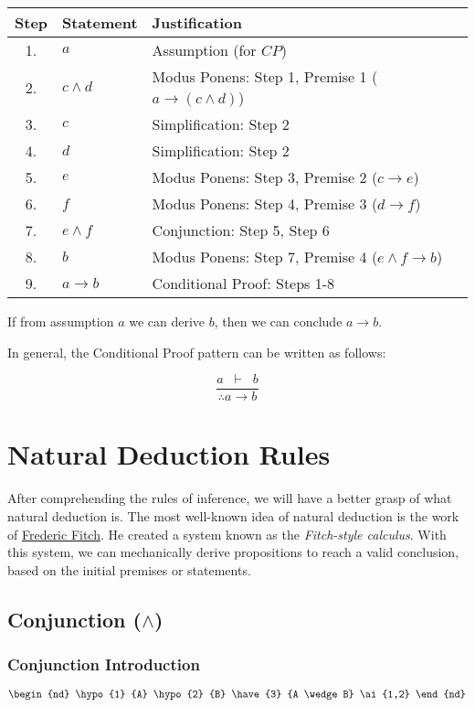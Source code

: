 \documentclass[12pt,a4paper,openany]{article}
\begin{document}
\begin{center}
\begin{tabular}{|c|l|l|}
\hline
\textbf{Step} & \textbf{Statement} & \textbf{Justification} \\
\hline
1. & \(a\) & Assumption (for \(CP\)) \\
2. & \(c \land d\) & Modus Ponens: Step 1, Premise 1 (\(a \to (c \land d)\)) \\
3. & \(c\) & Simplification: Step 2 \\
4. & \(d\) & Simplification: Step 2 \\
5. & \(e\) & Modus Ponens: Step 3, Premise 2 (\(c \to e\)) \\
6. & \(f\) & Modus Ponens: Step 4, Premise 3 (\(d \to f\)) \\
7. & \(e \land f\) & Conjunction: Step 5, Step 6 \\
8. & \(b\) & Modus Ponens: Step 7, Premise 4 (\(e \land f \to b\)) \\
9. & \(a \to b\) & Conditional Proof: Steps 1-8 \\
\hline
\end{tabular}
\end{center}

If from assumption \(a\) we can derive \(b\), then we can conclude \(a \to b\).

In general, the Conditional Proof pattern can be written as follows:

\[
\frac{a \;\; \vdash \;\; b}{\therefore a \to b}
\]


\section{Natural Deduction Rules}

After comprehending the rules of inference, we will have a better grasp of what natural deduction is. 
The most well-known idea of natural deduction is the work of \href{https://en.wikipedia.org/wiki/Frederic_Fitch}{Frederic Fitch}. 
He created a system known as the \emph{Fitch-style calculus}.
With this system, we can mechanically derive propositions to reach a valid conclusion, based on the initial premises or statements.

\subsection{Conjunction ($\wedge$)}\label{conjunction}

\subsubsection{Conjunction Introduction}
\[
\begin{nd}
 \hypo{1} {A}
 \hypo{2} {B}
 \have{3} {A \wedge B}  \ai{1,2}
\end{nd}
\]
\end{document}
